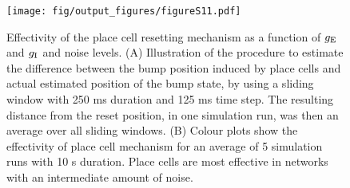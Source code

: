 \documentclass[a4paper,12pt]{article}
\newcommand{\ssc}[3]{\ensuremath{#1_{\text{#2}_{\text{#3}}}}}
\newcommand{\gE      }{\ssc{g}      {\scriptsize{E}}{}}
\newcommand{\gI      }{\ssc{g}      {\scriptsize{I}}{}}
\begin{document}
\clearpage

%

\begin{figure}[ht!]
    \internallinenumbers
    \centering
        \texttt{[image: fig/output\_figures/figureS11.pdf]}
    \caption{Effectivity of the place cell resetting mechanism as a function of
    $\gE$ and $\gI$ and noise levels. (A) Illustration of the procedure to
    estimate the difference between the bump position induced by place cells
    and actual estimated position of the bump state, by using a sliding window
    with 250 ms duration and 125 ms time step. The resulting distance from the
    reset position, in one simulation run, was then an average over all sliding
    windows. (B) Colour plots show the effectivity of place cell mechanism for
    an average of 5 simulation runs with 10 s duration. Place cells are most
    effective in networks with an intermediate amount of noise.}
    \label{fig:S_pc_effectivity}
\end{figure}

\clearpage
\end{document}
